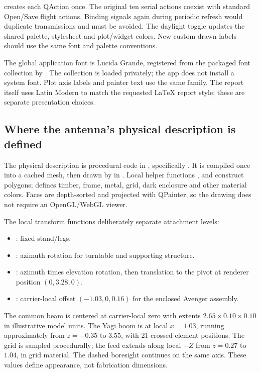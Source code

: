  creates each QAction once. The original ten serial
actions coexist with standard Open/Save flight actions. Binding signals again
during periodic refresh would duplicate transmissions and must be avoided.
The daylight toggle updates the shared palette, stylesheet and plot/widget
colors. New custom-drawn labels should use the same font and palette conventions.

The global application font is Lucida Grande, registered from the packaged
font collection by . The collection is loaded privately;
the app does not install a system font. Plot axis labels and painter text use
the same family. The report itself uses Latin Modern to match the requested
LaTeX report style; these are separate presentation choices.

\subsection{Where the antenna's physical description is defined}
The physical description is procedural code in
, specifically
. It is compiled once into a cached mesh, then drawn by
 in .
Local helper functions ,  and  construct polygons;
 defines timber, frame, metal, grid, dark enclosure and other
material colors. Faces are depth-sorted and projected with QPainter, so the
drawing does not require an OpenGL/WebGL viewer.

The local transform functions deliberately separate attachment levels:
\begin{itemize}
\item {}: fixed stand/legs.
\item {}: azimuth rotation for turntable and supporting structure.
\item {}: azimuth times elevation rotation, then translation to
the pivot at renderer position \((0,3.28,0)\).
\item {}: carrier-local offset \((-1.03,0,0.16)\) for the enclosed
Avenger assembly.
\end{itemize}
The common beam is centered at carrier-local zero with extents
\(2.65\times0.10\times0.10\) in illustrative model units.
The Yagi boom is at local \(x=1.03\), running approximately from \(z=-0.35\)
to \(3.55\), with 21 crossed element positions. The grid is sampled procedurally;
the feed extends along local \(+Z\) from \(z=0.27\) to \(1.04\), in grid material.
The dashed boresight continues on the same axis. These values define appearance,
not fabrication dimensions.

